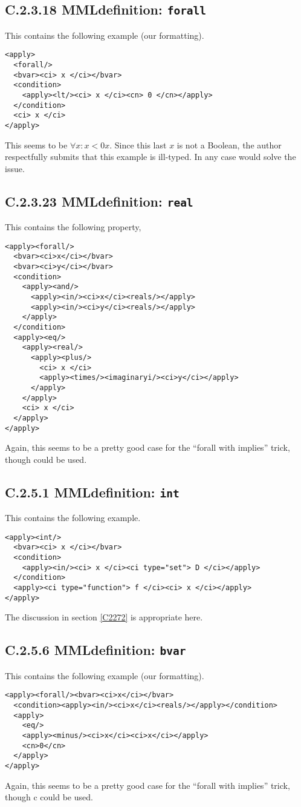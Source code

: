 \documentclass{llncs}
\begin{document}
{\subsection{C.2.3.18 MMLdefinition: {\tt forall}}\label{C2318}
This contains the following example (our formatting).
\begin{lstlisting}[language=MathML2]
<apply>
  <forall/>
  <bvar><ci> x </ci></bvar>
  <condition>
    <apply><lt/><ci> x </ci><cn> 0 </cn></apply>
  </condition>
  <ci> x </ci>
</apply>
\end{lstlisting}
This seems to be $\forall x:x<0 x$. Since this last $x$ is not a Boolean, the
author respectfully submits that this example is ill-typed. In any case
{} would solve the issue. 
\subsection{C.2.3.23 MMLdefinition: {\tt real}}\label{C2323}
This contains the following property,
\begin{lstlisting}[language=MathML2]
<apply><forall/>
  <bvar><ci>x</ci></bvar>
  <bvar><ci>y</ci></bvar>
  <condition>
    <apply><and/>
      <apply><in/><ci>x</ci><reals/></apply>
      <apply><in/><ci>y</ci><reals/></apply>
    </apply>
  </condition>
  <apply><eq/>
    <apply><real/>
      <apply><plus/>
        <ci> x </ci>
        <apply><times/><imaginaryi/><ci>y</ci></apply>
      </apply>
    </apply>
    <ci> x </ci>
  </apply>
</apply>
\end{lstlisting}
Again, this seems to be a pretty good case for the ``forall with implies''
trick, though {} could be used.
\subsection{C.2.5.1 MMLdefinition: {\tt int}}\label{C251}
This contains the following example.
\begin{lstlisting}[language=MathML2]
<apply><int/>
  <bvar><ci> x </ci></bvar>
  <condition>
    <apply><in/><ci> x </ci><ci type="set"> D </ci></apply>
  </condition>
  <apply><ci type="function"> f </ci><ci> x </ci></apply>
</apply>
\end{lstlisting}
The discussion in section \ref{C2272} is appropriate here.
\subsection{C.2.5.6 MMLdefinition: {\tt bvar}}\label{C256}
This contains the following example (our formatting).
\begin{lstlisting}[language=MathML2]
<apply><forall/><bvar><ci>x</ci></bvar>
  <condition><apply><in/><ci>x</ci><reals/></apply></condition>
  <apply>
    <eq/>
    <apply><minus/><ci>x</ci><ci>x</ci></apply>
    <cn>0</cn>
  </apply>
</apply>
\end{lstlisting}
Again, this seems to be a pretty good case for the ``forall with implies''
trick, though c{} could be used.
}
\end{document}
